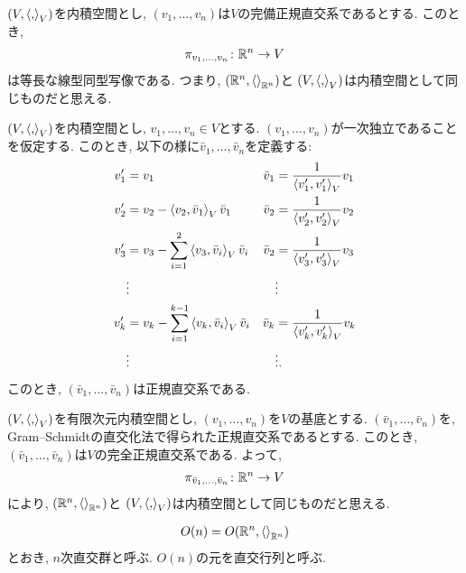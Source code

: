 \begin{lemma}
  $(V,\Braket{,}_V)$を内積空間とし,
  $(v_1,\ldots,v_n)$は$V$の完備正規直交系であるとする.
  このとき,
  \begin{align*}
    \pi_{v_1,\ldots,v_n}\colon \mathbb{R}^n\to V
  \end{align*}
  は等長な線型同型写像である.
  つまり,
  $(\mathbb{R}^n,\Braket{}_{\mathbb{R}^n})$と
  $(V,\Braket{,}_V)$は内積空間として同じものだと思える.
\end{lemma}


\begin{theorem}
  $(V,\Braket{,}_V)$を内積空間とし,
  $v_1,\ldots,v_n\in V$とする.
  $(v_1,\ldots,v_n)$が一次独立であることを仮定する.
  このとき, 以下の様に$\bar v_1,\ldots, \bar v_n$を定義する:
  \begin{align*}
    v'_1&=v_1&
    \bar v_1&=\frac{1}{\Braket{v'_1,v'_1}_V}v_1\\
    v'_2&=v_2-\Braket{v_2,\bar v_1}_V \bar v_1&
    \bar v_2&=\frac{1}{\Braket{v'_2,v'_2}_V}v_2\\
    v'_3&=v_3-\sum_{i=1}^{2}\Braket{v_3,\bar v_i}_V \bar v_i&
    \bar v_2&=\frac{1}{\Braket{v'_3,v'_3}_V}v_3\\
    &\vdots&&\vdots\\
    v'_k&=v_k-\sum_{i=1}^{k-1}\Braket{v_k,\bar v_i}_V \bar v_i&
    \bar v_k&=\frac{1}{\Braket{v'_k,v'_k}_V}v_k\\
    &\vdots&&\vdots.
  \end{align*}
  このとき,
  $(\bar v_1,\ldots, \bar v_n)$は正規直交系である.
\end{theorem}
\begin{remark}
  $(V,\Braket{,}_V)$を有限次元内積空間とし,
  $(v_1,\ldots,v_n)$を$V$の基底とする.
  $(\bar v_1,\ldots, \bar v_n)$を,
  Gram--Schmidtの直交化法で得られた正規直交系であるとする.
  このとき,
  $(\bar v_1,\ldots, \bar v_n)$は$V$の完全正規直交系である.
  よって,
  \begin{align*}
    \pi_{\bar v_1,\ldots,\bar v_n}\colon \mathbb{R}^n\to V
  \end{align*}
  により,
  $(\mathbb{R}^n,\Braket{}_{\mathbb{R}^n})$と
  $(V,\Braket{,}_V)$は内積空間として同じものだと思える.  
\end{remark}
\begin{definition}
  \begin{align*}
    O(n)=O(\mathbb{R}^n,\Braket{}_{\mathbb{R}^n})
  \end{align*}
  とおき, $n$次直交群と呼ぶ.
  $O(n)$の元を直交行列と呼ぶ.
\end{definition}


